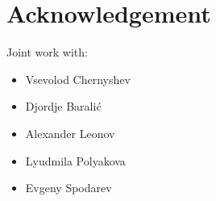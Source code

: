 \chapter*{Acknowledgement}

Joint work with:
\begin{itemize}
    \item Vsevolod Chernyshev
    \item Djordje Baralić
    \item Alexander Leonov
    \item Lyudmila Polyakova
    \item Evgeny Spodarev
\end{itemize}